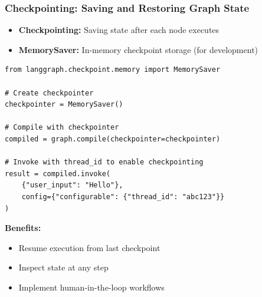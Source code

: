 \documentclass[aspectratio=169,11pt]{beamer}
\begin{document}
\begin{frame}[fragile]
\frametitle{Checkpointing: Saving and Restoring Graph State}
\begin{itemize}
    \setlength{\itemsep}{1pt}
  \item \textbf{Checkpointing:} Saving state after each node executes
  \item \textbf{MemorySaver:} In-memory checkpoint storage (for development)
\end{itemize}

\vspace{10pt}
\begin{lstlisting}
from langgraph.checkpoint.memory import MemorySaver

# Create checkpointer
checkpointer = MemorySaver()

# Compile with checkpointer
compiled = graph.compile(checkpointer=checkpointer)

# Invoke with thread_id to enable checkpointing
result = compiled.invoke(
    {"user_input": "Hello"},
    config={"configurable": {"thread_id": "abc123"}}
)
\end{lstlisting}

\vspace{10pt}
\textbf{Benefits:}
\begin{itemize}
    \setlength{\itemsep}{1pt}
  \item Resume execution from last checkpoint
  \item Inspect state at any step
  \item Implement human-in-the-loop workflows
\end{itemize}
\end{frame}
\end{document}

